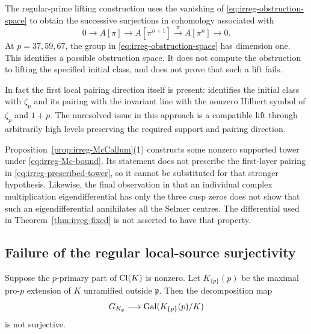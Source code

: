 The regular-prime lifting construction uses the vanishing of
\eqref{eq:irreg-obstruction-space} to obtain the successive
surjections in cohomology associated with
\begin{equation}
 0\longrightarrow A[\pi]\longrightarrow A[\pi^{n+1}]
   \xrightarrow{\pi}A[\pi^n]\longrightarrow0.
 \label{eq:irreg-lift-sequence}
\end{equation}
At \(p=37,59,67\), the group in
\eqref{eq:irreg-obstruction-space} has dimension one.
This identifies a possible obstruction space. It does not compute
the obstruction to lifting the specified initial class, and does
not prove that such a lift fails.

In fact the first local pairing direction itself is present:
\cite[Lemma 10, pp.~581--582]{McCallum1994}
identifies the initial class with \(\zeta_p\) and its pairing with
the invariant line with the nonzero Hilbert symbol of
\(\zeta_p\) and \(1+p\).
The unresolved issue in this approach is a compatible lift through
arbitrarily high levels preserving the required support and
pairing direction.

Proposition~\ref{prop:irreg-McCallum}(1) constructs some nonzero
supported tower under \eqref{eq:irreg-Mc-bound}. Its statement
does not prescribe the first-layer pairing in
\eqref{eq:irreg-prescribed-tower}, so it cannot be substituted for
that stronger hypothesis. Likewise, the final observation in
\cite[pp.~405--406]{McCallum2001Brauer} that an individual complex
multiplication eigendifferential has only the three cusp zeros
does not show that such an eigendifferential annihilates all the
Selmer centres. The differential used in
Theorem~\ref{thm:irreg-fixed} is not asserted to have that property.

\subsection{Failure of the regular local-source surjectivity}

\begin{proposition}\label{prop:irreg-source-failure}
Suppose the \(p\)-primary part of \(\operatorname{Cl}(K)\) is nonzero. Let
\(K_{\{p\}}(p)\) be the maximal pro-\(p\) extension of \(K\)
unramified outside \(\mathfrak p\). Then the decomposition map
\begin{equation}
 G_{K_{\mathfrak p}}\longrightarrow
 \operatorname{Gal}(K_{\{p\}}(p)/K)
 \label{eq:irreg-source-map}
\end{equation}
is not surjective.
\end{proposition}

